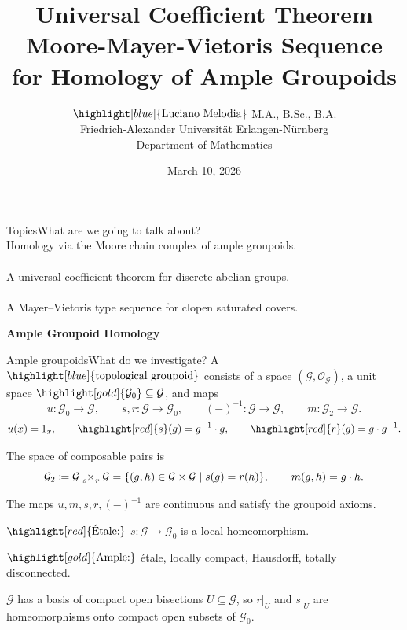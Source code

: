\documentclass[aspectratio=169]{beamer}
\title{\textbf{Universal Coefficient Theorem} \\ \textbf{Moore-Mayer-Vietoris Sequence} \\ for Homology of Ample Groupoids}
\author{$\highlight[blue]{\text{Luciano Melodia}}$ {\scriptsize M.A., B.Sc., B.A.}\\ Friedrich-Alexander Universität Erlangen-Nürnberg \\ Department of Mathematics}
\date{March 10, 2026}
\newcommand{\G}{\mathcal{G}}
\newcommand{\Gz}{\G_{0}}
\newcommand{\stimesr}{\tensor[_s]{\times}{_r}}
\begin{document}
\begin{frame}[plain]
  \maketitle
\end{frame}

\begin{frame}{Topics}{What are we going to talk about?}
   \\
  {\scriptsize Homology via the Moore chain complex of ample groupoids.}\\[0.3cm]
   \\
  {\scriptsize A universal coefficient theorem for discrete abelian groups.}\\[0.3cm]
   \\
  {\scriptsize A Mayer--Vietoris type sequence for clopen saturated covers.}
\end{frame}

\begin{frame}[plain,c]
  \begin{center}
    \Huge \textbf{Ample Groupoid Homology}
  \end{center}
\end{frame}

\begin{frame}{Ample groupoids}{What do we investigate?}
  A $\highlight[blue]{\text{topological groupoid}}$ consists of a space \((\G,\mathcal{O}_{\mathcal{G}})\), a unit space \(\highlight[gold]{\Gz} \subseteq \mathcal{G}\), and maps
  \[
    u\colon \Gz\to \G,\qquad
    s,r\colon \G\to \Gz,\qquad
    (-)^{-1}\colon \G\to \G,\qquad
    m\colon \G_2\to \G.
  \]
  \[
    u(x)=1_x,
    \qquad\highlight[red]{s}(g)=g^{-1}\cdot g,
    \qquad
    \highlight[red]{r}(g)=g\cdot g^{-1}.
  \]
  \pause

  The space of composable pairs is
  \[
    \G_2 \coloneqq \G \stimesr \G = \{(g,h)\in \G\times \G \mid s(g)=r(h)\},
    \qquad
    m(g,h)=g\cdot h.
  \]
  \pause

  The maps \(u,m,s,r,(-)^{-1}\) are continuous and satisfy the groupoid axioms.
  \pause

  $\highlight[red]{\text{\'Etale:}}$ \(s\colon \G\to \Gz\) is a local homeomorphism.
  \pause

  $\highlight[gold]{\text{Ample:}}$ \'etale, locally compact, Hausdorff, totally disconnected.
  \pause

  \(\G\) has a basis of compact open bisections \(U\subseteq \G\), so \(r|_U\) and \(s|_U\) are homeomorphisms onto compact open subsets of \(\Gz\).
\end{frame}
\end{document}
